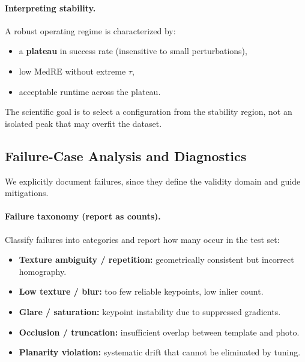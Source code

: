 \paragraph{Interpreting stability.}
A robust operating regime is characterized by:
\begin{itemize}
  \item a \textbf{plateau} in success rate (insensitive to small perturbations),
  \item low MedRE without extreme $\tau$,
  \item acceptable runtime across the plateau.
\end{itemize}
The scientific goal is to select a configuration from the stability region, not an isolated peak that may overfit the dataset.

\subsection{Failure-Case Analysis and Diagnostics}
We explicitly document failures, since they define the validity domain and guide mitigations.


\paragraph{Failure taxonomy (report as counts).}
Classify failures into categories and report how many occur in the test set:
\begin{itemize}
  \item \textbf{Texture ambiguity / repetition:} geometrically consistent but incorrect homography.
  \item \textbf{Low texture / blur:} too few reliable keypoints, low inlier count.
  \item \textbf{Glare / saturation:} keypoint instability due to suppressed gradients.
  \item \textbf{Occlusion / truncation:} insufficient overlap between template and photo.
  \item \textbf{Planarity violation:} systematic drift that cannot be eliminated by tuning.
\end{itemize}

